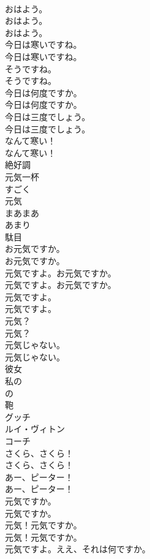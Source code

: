 \documentclass[8pt]{extreport}
\begin{document}
\begin{CJK}{UTF8}{min}
\\	おはよう。 
\\	おはよう。	
\\	おはよう。 
\\	今日は寒いですね。	
\\	今日は寒いですね。 
\\	そうですね。	
\\	そうですね。 
\\	今日は何度ですか。	
\\	今日は何度ですか。 
\\	今日は三度でしょう。	
\\	今日は三度でしょう。 
\\	なんて寒い！	
\\	なんて寒い！ 
\\	絶好調
\\	元気一杯
\\	すごく
\\	元気
\\	まあまあ
\\	あまり
\\	駄目
\\	お元気ですか。	
\\	お元気ですか。 
\\	元気ですよ。お元気ですか。	
\\	元気ですよ。お元気ですか。 
\\	元気ですよ。	
\\	元気ですよ。 
\\	元気？	
\\	元気？ 
\\	元気じゃない。	
\\	元気じゃない。 
\\	彼女
\\	私の
\\	の
\\	鞄
\\	グッチ
\\	ルイ・ヴィトン
\\	コーチ
\\	さくら、さくら！	
\\	さくら、さくら！ 
\\	あー、ピーター！	
\\	あー、ピーター！ 
\\	元気ですか。	
\\	元気ですか。 
\\	元気！元気ですか。	
\\	元気！元気ですか。 
\\	元気ですよ。ええ、それは何ですか。	

\end{CJK}
\end{document}
